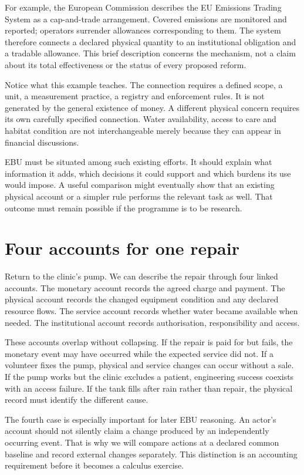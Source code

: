 For example, the European Commission describes the EU Emissions Trading System as a cap-and-trade arrangement. Covered emissions are monitored and reported; operators surrender allowances corresponding to them. The system therefore connects a declared physical quantity to an institutional obligation and a tradable allowance. This brief description concerns the mechanism, not a claim about its total effectiveness or the status of every proposed reform.\cite{intro-ets}

Notice what this example teaches. The connection requires a defined scope, a unit, a measurement practice, a registry and enforcement rules. It is not generated by the general existence of money. A different physical concern requires its own carefully specified connection. Water availability, access to care and habitat condition are not interchangeable merely because they can appear in financial discussions.

EBU must be situated among such existing efforts. It should explain what information it adds, which decisions it could support and which burdens its use would impose. A useful comparison might eventually show that an existing physical account or a simpler rule performs the relevant task as well. That outcome must remain possible if the programme is to be research.

\section{Four accounts for one repair}
Return to the clinic's pump. We can describe the repair through four linked accounts. The monetary account records the agreed charge and payment. The physical account records the changed equipment condition and any declared resource flows. The service account records whether water became available when needed. The institutional account records authorisation, responsibility and access.

These accounts overlap without collapsing. If the repair is paid for but fails, the monetary event may have occurred while the expected service did not. If a volunteer fixes the pump, physical and service changes can occur without a sale. If the pump works but the clinic excludes a patient, engineering success coexists with an access failure. If the tank fills after rain rather than repair, the physical record must identify the different cause.

The fourth case is especially important for later EBU reasoning. An actor's account should not silently claim a change produced by an independently occurring event. That is why we will compare actions at a declared common baseline and record external changes separately. This distinction is an accounting requirement before it becomes a calculus exercise.


